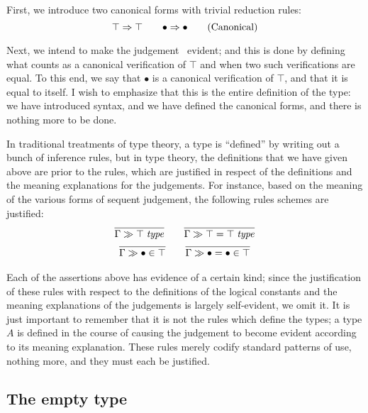 \documentclass[main.tex]{subfiles}
\begin{document}
First, we introduce two canonical forms with trivial reduction rules:
\begin{equation}
  \top\Rightarrow\top\qquad
  \bullet\Rightarrow\bullet
  \tag{Canonical}
\end{equation}

Next, we intend to make the judgement \isset\top\ evident; and this is done by
defining what counts as a canonical verification of $\top$ and when two such
verifications are equal. To this end, we say that $\bullet$ is a canonical
verification of $\top$, and that it is equal to itself.  I wish to emphasize
that this is the entire definition of the type: we have introduced syntax, and
we have defined the canonical forms, and there is nothing more to be done.

In traditional treatments of type theory, a type is ``defined'' by writing out
a bunch of inference rules, but in type theory, the definitions that we have
given above are prior to the rules, which are justified in respect of the
definitions and the meaning explanations for the judgements. For instance,
based on the meaning of the various forms of sequent judgement, the following
rules schemes are justified:
\begin{gather*}
  \infer{
    \sequent\Gamma\isset\top
  }{
  }\qquad
  \infer{
    \sequent\Gamma\isset{\top=\top}
  }{
  }\\
  \infer{
    \sequent\Gamma\ver\bullet\top
  }{
  }\qquad
  \infer{
    \sequent\Gamma\ver{\bullet=\bullet}{\top}
  }{
  }
\end{gather*}

Each of the assertions above has evidence of a certain kind; since the
justification of these rules with respect to the definitions of the logical
constants and the meaning explanations of the judgements is largely
self-evident, we omit it. It is just important to remember that it is not the
rules which define the types; a type $A$ is defined in the course of causing
the judgement  to become evident according to its meaning explanation.
These rules merely codify standard patterns of use, nothing more, and they must
each be justified.

\subsection{The empty type}
\end{document}
